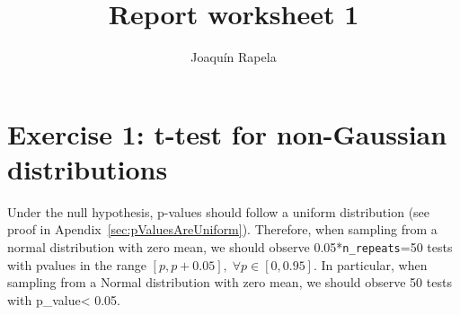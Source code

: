 \documentclass{article}
\title{Report worksheet 1}
\author{Joaqu\'{i}n Rapela}
\begin{document}
\maketitle

\section*{Exercise 1: t-test for non-Gaussian distributions}

Under the null hypothesis, p-values should follow a uniform distribution (see
proof in Apendix~\ref{sec:pValuesAreUniform}). Therefore, when sampling from a
normal distribution with zero mean, we should observe
0.05*\texttt{n\_repeats}=50 tests with pvalues in the range $[p,
p+0.05],\;\forall p\in[0, 0.95]$. In particular, when sampling from a Normal
distribution with zero mean, we should observe 50 tests with p\_value\textless
0.05.
\end{document}
